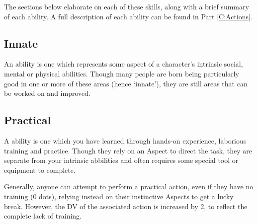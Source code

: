 The sections below elaborate on each of these skills, along with a brief summary of each ability. A full description of each ability can be found in Part \ref{C:Actions}.


\subsection{Innate}

An  ability is one which represents some aspect of a character's intrinsic social, mental or physical abilities. Though many people are born being particularly good in one or more of these areas (hence `innate'), they are still areas that can be worked on and improved. 


\abilityTable
{
}


\subsection{Practical}

A  ability is one which you have learned through hands-on experience, laborious training and practice. Though they rely on an Aspect to direct the task, they are separate from your intrinsic abbilities and often requires some special tool or equipment to complete. 

Generally, anyone can attempt to perform a practical action, even if they have no training (0 dots), relying instead on their instinctive Aspects to get a lucky break. However, the DV of the associated action is increased by 2, to reflect the complete lack of training. 
 
